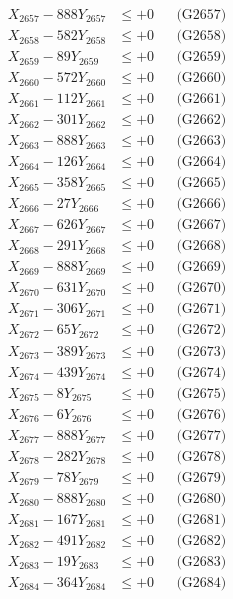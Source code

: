 \documentclass[a4paper,10pt]{article}
\begin{document}
{\begin{align}
X_{2657} - 888Y_{2657} &\leq +0 && \text{(G2657)} \\
X_{2658} - 582Y_{2658} &\leq +0 && \text{(G2658)} \\
X_{2659} - 89Y_{2659} &\leq +0 && \text{(G2659)} \\
X_{2660} - 572Y_{2660} &\leq +0 && \text{(G2660)} \\
\allowbreak
X_{2661} - 112Y_{2661} &\leq +0 && \text{(G2661)} \\
X_{2662} - 301Y_{2662} &\leq +0 && \text{(G2662)} \\
X_{2663} - 888Y_{2663} &\leq +0 && \text{(G2663)} \\
X_{2664} - 126Y_{2664} &\leq +0 && \text{(G2664)} \\
X_{2665} - 358Y_{2665} &\leq +0 && \text{(G2665)} \\
X_{2666} - 27Y_{2666} &\leq +0 && \text{(G2666)} \\
X_{2667} - 626Y_{2667} &\leq +0 && \text{(G2667)} \\
X_{2668} - 291Y_{2668} &\leq +0 && \text{(G2668)} \\
X_{2669} - 888Y_{2669} &\leq +0 && \text{(G2669)} \\
X_{2670} - 631Y_{2670} &\leq +0 && \text{(G2670)} \\
\allowbreak
X_{2671} - 306Y_{2671} &\leq +0 && \text{(G2671)} \\
X_{2672} - 65Y_{2672} &\leq +0 && \text{(G2672)} \\
X_{2673} - 389Y_{2673} &\leq +0 && \text{(G2673)} \\
X_{2674} - 439Y_{2674} &\leq +0 && \text{(G2674)} \\
X_{2675} - 8Y_{2675} &\leq +0 && \text{(G2675)} \\
X_{2676} - 6Y_{2676} &\leq +0 && \text{(G2676)} \\
X_{2677} - 888Y_{2677} &\leq +0 && \text{(G2677)} \\
X_{2678} - 282Y_{2678} &\leq +0 && \text{(G2678)} \\
X_{2679} - 78Y_{2679} &\leq +0 && \text{(G2679)} \\
X_{2680} - 888Y_{2680} &\leq +0 && \text{(G2680)} \\
\allowbreak
X_{2681} - 167Y_{2681} &\leq +0 && \text{(G2681)} \\
X_{2682} - 491Y_{2682} &\leq +0 && \text{(G2682)} \\
X_{2683} - 19Y_{2683} &\leq +0 && \text{(G2683)} \\
X_{2684} - 364Y_{2684} &\leq +0 && \text{(G2684)} \\

\end{align}}
\end{document}
